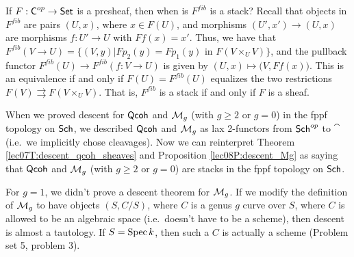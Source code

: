  \begin{example}
   If $F:\text{\sf C}^{op}\to \text{\sf Set}$ is a presheaf, then when is $F^{fib}$ is a stack? Recall that
   objects in $F^{fib}$ are pairs $(U,x)$, where $x\in F(U)$, and morphisms $(U',x')\to
   (U,x)$ are morphisms $f:U'\to U$ with $Ff(x)=x'$. Thus, we have that $F^{fib}(V\to U)
   = \{(V,y)| Fp_2(y)=Fp_1(y) \text{ in }F(V\times_U V)\}$, and the pullback functor
   $F^{fib}(U)\to F^{fib}(f:V\to U)$ is given by $(U,x)\mapsto \bigl(V,Ff(x)\bigr)$. This
   is an equivalence if and only if $F(U)=F^{fib}(U)$ equalizes the two restrictions
   $F(V)\rightrightarrows F(V\times_U V)$. That is, $F^{fib}$ is a stack if and only if
   $F$ is a sheaf.
 \end{example}
 \begin{example}
   When we proved descent for $\text{\sf Qcoh}$ and $\mathcal{M}_g$ (with $g\ge 2$ or $g=0$) in the fppf
   topology on $\text{\sf Sch}$, we described $\text{\sf Qcoh}$ and $\mathcal{M}_g$ as lax 2-functors from $\text{\sf Sch}^{op}$
   to $\cat$ (i.e.~we implicitly chose cleavages). Now we can reinterpret Theorem
   \ref{lec07T:descent_qcoh_sheaves} and Proposition \ref{lec08P:descent_Mg} as saying
   that $\text{\sf Qcoh}$ and $\mathcal{M}_g$ (with $g\ge 2$ or $g=0$) are stacks in the fppf topology on
   $\text{\sf Sch}$.
%
 \end{example}
 \begin{remark}
   For $g=1$, we didn't prove a descent theorem for $\mathcal{M}_g$. If we modify the definition
   of $\mathcal{M}_g$ to have objects $(S,C/S)$, where $C$ is a genus $g$ curve over $S$, where
   $C$ is allowed to be an algebraic space (i.e.~doesn't have to be a scheme), then
   descent is almost a tautology.  If $S=\operatorname{Spec} k$,
   then such a $C$ is actually a scheme (Problem set 5, problem 3).
 \end{remark}


